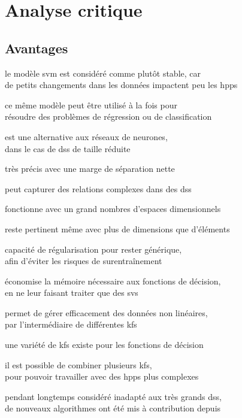 \section{Analyse critique}

\subsection{Avantages}

\begin{itmz}
\item{le modèle \gls{svm} est considéré comme plutôt stable, car\\
de petits changements dans les données impactent peu les \glspl{hpp}}
\item{ce même modèle peut être utilisé à la fois pour\\
résoudre des problèmes de régression ou de classification}
\item{est une alternative aux réseaux de neurones,\\
dans le cas de \glspl{ds} de taille réduite}
\item{très précis avec une marge de séparation nette}
\item{peut capturer des relations complexes dans des \glspl{ds}}
\item{fonctionne avec un grand nombres d’espaces dimensionnels}
\item{reste pertinent même avec plus de dimensions que d’éléments}
\item{capacité de régularisation pour rester générique,\\
afin d’éviter les risques de surentraînement}
\item{économise la mémoire nécessaire aux fonctions de décision,\\
en ne leur faisant traiter que des \glspl{sv}}
\item{permet de gérer efficacement des données non linéaires,\\
par l’intermédiaire de différentes \glspl{kf}}
\item{une variété de \glspl{kf} existe pour les fonctions de décision}
\item{il est possible de combiner plusieurs \glspl{kf},\\
pour pouvoir travailler avec des \glspl{hpp} plus complexes}
\item{pendant longtemps considéré inadapté aux très grands \glspl{ds},\\
de nouveaux algorithmes ont été mis à contribution depuis \cite{large-scale}}
\end{itmz}

